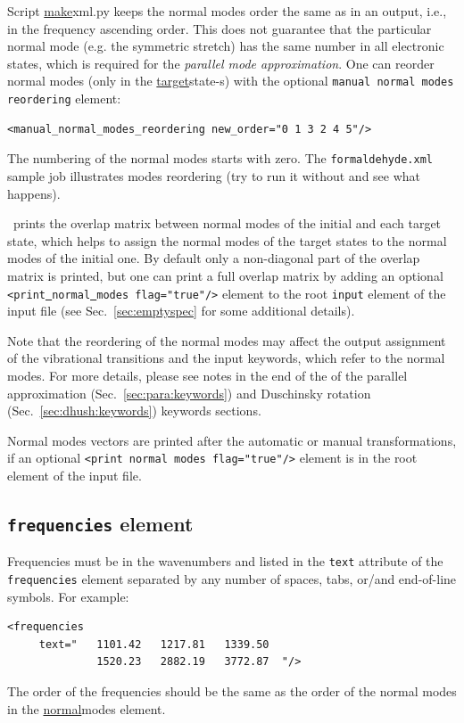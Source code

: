 \documentclass[11pt]{article}
\begin{document}
Script \ul{make}{xml.py} keeps the normal modes order the same as in an \ai output, i.e., in the frequency ascending order. 
This does not guarantee that the particular normal mode 
(e.g. the symmetric stretch) has the same number 
in all electronic states, which is required for the {\em parallel mode approximation}.
One can reorder normal modes (only in the \ul{target}{state}-s) with the optional 
{\tt manual normal modes reordering} element:
\begin{lstlisting}[frame=single,framerule=0pt]
  <manual_normal_modes_reordering new_order="0 1 3 2 4 5"/>
\end{lstlisting}
The numbering of the normal modes starts with zero. The \texttt{formaldehyde.xml} sample job
illustrates modes reordering (try to run it without and see what happens).

\ezFCF\ prints the overlap matrix between normal modes of the initial and each target state,
which helps to assign the normal modes of the target states to the normal modes of the initial one.
By default only a non-diagonal part of the overlap matrix is printed, 
but one can print a full overlap matrix by adding an optional {\tt <print\underline{~}normal\underline{~}modes flag="true"/>} 
element to the root {\tt input} element of the input file (see Sec.~\ref{sec:emptyspec} for some additional details).

Note that the reordering of the normal modes may affect the output assignment of the vibrational transitions and
the input keywords, which refer to the normal modes. For more details, please see notes in the end of the  
of the parallel approximation (Sec.~\ref{sec:para:keywords}) 
and Duschinsky rotation (Sec.~\ref{sec:dhush:keywords}) keywords sections.

Normal modes vectors are printed after the automatic or manual transformations,
if an optional {\tt <print normal modes flag="true"/>} 
element is in the root element of the input file.

\subsection{\texttt{frequencies} element}
\label{sec:freq}

Frequencies must be in the wavenumbers and listed in the {\tt text} attribute of the {\tt frequencies} 
element separated by any number of spaces, tabs, or/and end-of-line symbols. For example:
\begin{lstlisting}[frame=single,framerule=0pt]
  <frequencies 
     text="   1101.42   1217.81   1339.50    
              1520.23   2882.19   3772.87  "/>
\end{lstlisting}
The order of the frequencies should be the same as the order of the normal modes in the \ul{normal}{modes} element.
\end{document}
